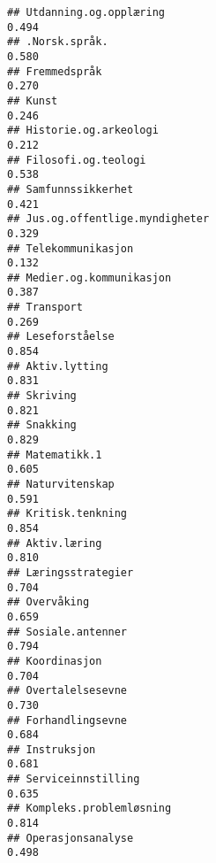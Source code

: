\documentclass[
]{article}
\begin{document}
\begin{verbatim}
## Utdanning.og.opplæring                                                           0.494
## .Norsk.språk.                                                                    0.580
## Fremmedspråk                                                                     0.270
## Kunst                                                                            0.246
## Historie.og.arkeologi                                                            0.212
## Filosofi.og.teologi                                                              0.538
## Samfunnssikkerhet                                                                0.421
## Jus.og.offentlige.myndigheter                                                    0.329
## Telekommunikasjon                                                                0.132
## Medier.og.kommunikasjon                                                          0.387
## Transport                                                                        0.269
## Leseforståelse                                                                   0.854
## Aktiv.lytting                                                                    0.831
## Skriving                                                                         0.821
## Snakking                                                                         0.829
## Matematikk.1                                                                     0.605
## Naturvitenskap                                                                   0.591
## Kritisk.tenkning                                                                 0.854
## Aktiv.læring                                                                     0.810
## Læringsstrategier                                                                0.704
## Overvåking                                                                       0.659
## Sosiale.antenner                                                                 0.794
## Koordinasjon                                                                     0.704
## Overtalelsesevne                                                                 0.730
## Forhandlingsevne                                                                 0.684
## Instruksjon                                                                      0.681
## Serviceinnstilling                                                               0.635
## Kompleks.problemløsning                                                          0.814
## Operasjonsanalyse                                                                0.498

\end{verbatim}
\end{document}
